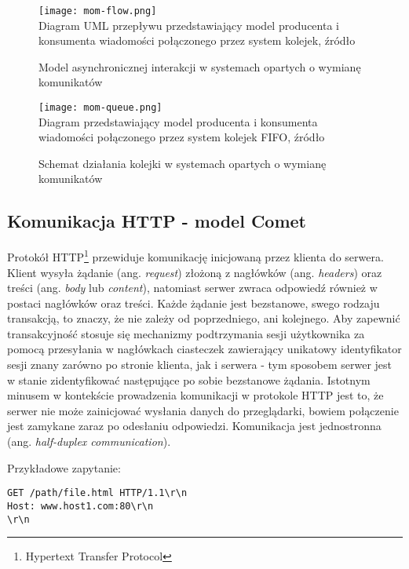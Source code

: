 \begin{figure}[H]
  \caption[Model asynchronicznej interakcji w systemach opartych o wymianę komunikatów]{Model asynchronicznej interakcji w systemach opartych o wymianę komunikatów}
  \centering
    \texttt{[image: mom-flow.png]} \\
    Diagram UML przepływu przedstawiający model producenta i konsumenta wiadomości połączonego przez system kolejek, źródło\cite{message-oriented-middleware}
\end{figure}

\begin{figure}[H]
  \caption[Schemat działania kolejki w systemach opartych o wymianę komunikatów]{Schemat działania kolejki w systemach opartych o wymianę komunikatów}
  \centering
    \texttt{[image: mom-queue.png]} \\
    Diagram przedstawiający model producenta i konsumenta wiadomości połączonego przez system kolejek FIFO, źródło\cite{message-oriented-middleware}
\end{figure}

\subsection{Komunikacja HTTP - model Comet}
\label{sub:communication-methods}

Protokół HTTP\footnote{Hypertext Transfer Protocol} przewiduje komunikację inicjowaną przez klienta do serwera\cite{http-rfc}. Klient wysyła żądanie (ang. \emph{request}) złożoną z nagłówków (ang. \emph{headers}) oraz treści (ang. \emph{body} lub \emph{content}), natomiast serwer zwraca odpowiedź również w postaci nagłówków oraz treści. Każde żądanie jest bezstanowe, swego rodzaju transakcją, to znaczy, że nie zależy od poprzedniego, ani kolejnego. Aby zapewnić transakcyjność stosuje się mechanizmy podtrzymania sesji użytkownika za pomocą przesyłania w nagłówkach ciasteczek zawierający unikatowy identyfikator sesji znany zarówno po stronie klienta, jak i serwera - tym sposobem serwer jest w stanie zidentyfikować następujące po sobie bezstanowe żądania. Istotnym minusem w kontekście prowadzenia komunikacji w protokole HTTP jest to, że serwer nie może zainicjować wysłania danych do przeglądarki, bowiem połączenie jest zamykane zaraz po odesłaniu odpowiedzi. Komunikacja jest jednostronna (ang. \emph{half-duplex communication}).

Przykładowe zapytanie:
\lstset{language=Octave}
\begin{lstlisting}
GET /path/file.html HTTP/1.1\r\n
Host: www.host1.com:80\r\n
\r\n
\end{lstlisting}

